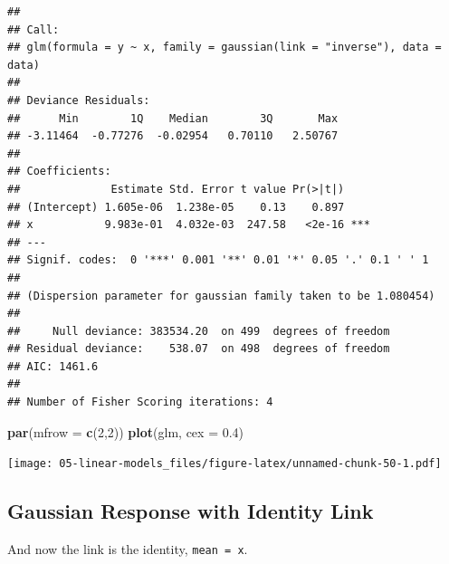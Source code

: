 \documentclass[openany]{book}
\newenvironment{Shaded}{\begin{snugshade}}{\end{snugshade}}
\newcommand{\ControlFlowTok}[1]{\textcolor[rgb]{0.13,0.29,0.53}{\textbf{#1}}}
\newcommand{\DataTypeTok}[1]{\textcolor[rgb]{0.13,0.29,0.53}{#1}}
\newcommand{\DecValTok}[1]{\textcolor[rgb]{0.00,0.00,0.81}{#1}}
\newcommand{\FloatTok}[1]{\textcolor[rgb]{0.00,0.00,0.81}{#1}}
\newcommand{\KeywordTok}[1]{\textcolor[rgb]{0.13,0.29,0.53}{\textbf{#1}}}
\newcommand{\NormalTok}[1]{#1}
\newcommand{\OperatorTok}[1]{\textcolor[rgb]{0.81,0.36,0.00}{\textbf{#1}}}
\newcommand{\StringTok}[1]{\textcolor[rgb]{0.31,0.60,0.02}{#1}}
\begin{document}
\begin{verbatim}
## 
## Call:
## glm(formula = y ~ x, family = gaussian(link = "inverse"), data = data)
## 
## Deviance Residuals: 
##      Min        1Q    Median        3Q       Max  
## -3.11464  -0.77276  -0.02954   0.70110   2.50767  
## 
## Coefficients:
##              Estimate Std. Error t value Pr(>|t|)    
## (Intercept) 1.605e-06  1.238e-05    0.13    0.897    
## x           9.983e-01  4.032e-03  247.58   <2e-16 ***
## ---
## Signif. codes:  0 '***' 0.001 '**' 0.01 '*' 0.05 '.' 0.1 ' ' 1
## 
## (Dispersion parameter for gaussian family taken to be 1.080454)
## 
##     Null deviance: 383534.20  on 499  degrees of freedom
## Residual deviance:    538.07  on 498  degrees of freedom
## AIC: 1461.6
## 
## Number of Fisher Scoring iterations: 4
\end{verbatim}

\begin{Shaded}
\begin{Highlighting}[]
\KeywordTok{par}\NormalTok{(}\DataTypeTok{mfrow =} \KeywordTok{c}\NormalTok{(}\DecValTok{2}\NormalTok{,}\DecValTok{2}\NormalTok{))}
\KeywordTok{plot}\NormalTok{(glm, }\DataTypeTok{cex =} \FloatTok{0.4}\NormalTok{)}
\end{Highlighting}
\end{Shaded}

\texttt{[image: 05-linear-models\_files/figure-latex/unnamed-chunk-50-1.pdf]}

\hypertarget{gaussian-response-with-identity-link}{%
\subsection{Gaussian Response with Identity Link}\label{gaussian-response-with-identity-link}}

And now the link is the identity, \texttt{mean\ =\ x}.

\begin{Shaded}
\end{Shaded}
\end{document}
